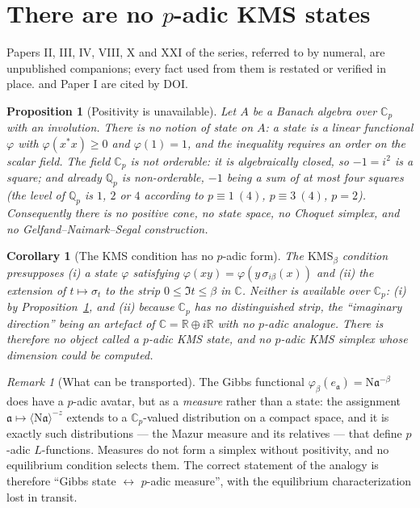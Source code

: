 \documentclass[11pt]{amsart}
\numberwithin{equation}{section}
\newtheorem{proposition}[theorem]{Proposition}
\newtheorem{corollary}[theorem]{Corollary}
\theoremstyle{definition}
\theoremstyle{remark}
\newtheorem{remark}[theorem]{Remark}
\newcommand{\Q}{\mathbb{Q}}
\newcommand{\R}{\mathbb{R}}
\newcommand{\C}{\mathbb{C}}
\newcommand{\Cp}{\mathbb{C}_p}
\newcommand{\aaa}{\mathfrak{a}}
\newcommand{\Ns}{\mathrm{N}}
\begin{document}
\maketitle

\section{There are no $p$-adic KMS states}

Papers II, III, IV, VIII, X and XXI of the series, referred to by numeral, are unpublished
companions; every fact used from them is restated or verified in place. \cite{Main} and
Paper I \cite{SeriesI} are cited by DOI.

\begin{proposition}[Positivity is unavailable]\label{prop:nostates}
Let $A$ be a Banach algebra over $\Cp$ with an involution. There is no notion of state on
$A$: a state is a linear functional $\varphi$ with $\varphi(x^*x)\ge0$ and $\varphi(1)=1$, and
the inequality requires an order on the scalar field. The field $\Cp$ is not orderable: it is
algebraically closed, so $-1=i^2$ is a square; and already $\Q_p$ is non-orderable, $-1$
being a sum of at most four squares (the level of $\Q_p$ is $1$, $2$ or $4$ according to
$p\equiv1\ (4)$, $p\equiv3\ (4)$, $p=2$). Consequently there is no positive cone, no state
space, no Choquet simplex, and no
Gelfand--Naimark--Segal construction.
\end{proposition}

\begin{corollary}[The KMS condition has no $p$-adic form]\label{cor:noKMS}
The $\mathrm{KMS}_\beta$ condition presupposes (i) a state $\varphi$ satisfying
$\varphi(xy)=\varphi(y\,\sigma_{i\beta}(x))$ and (ii) the extension of $t\mapsto\sigma_t$ to
the strip $0\le\Im t\le\beta$ in $\C$. Neither is
available over $\Cp$: (i) by Proposition~\ref{prop:nostates}, and (ii) because $\Cp$ has no
distinguished strip, the ``imaginary direction'' being an artefact of $\C=\R\oplus i\R$ with
no $p$-adic analogue. There is therefore no object called a $p$-adic KMS state, and no
$p$-adic KMS simplex whose dimension could be computed.
\end{corollary}

\begin{remark}[What can be transported]\label{rem:transport}
The Gibbs functional $\varphi_\beta(e_\aaa)=\Ns\aaa^{-\beta}$ does have a $p$-adic avatar,
but as a \emph{measure} rather than a state: the assignment
$\aaa\mapsto\langle\Ns\aaa\rangle^{-z}$ extends to a $\Cp$-valued distribution on a compact
space, and it is exactly such distributions --- the Mazur measure and its relatives --- that
define $p$-adic $L$-functions. Measures do not form a simplex without positivity, and no
equilibrium condition selects them. The correct statement of the analogy is therefore
``Gibbs state $\leftrightarrow$ $p$-adic measure'', with the equilibrium characterization lost
in transit.
\end{remark}
\end{document}
